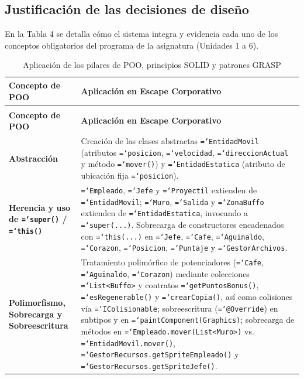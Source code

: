 \documentclass[12pt, a4paper]{article}
\DeclareRobustCommand{\code}[1]{\textcolor{codegreen}{\texttt{\hyphenchar\font=`\-#1}}}
\begin{document}
\subsection{Justificación de las decisiones de diseño}

En la Tabla 4 se detalla cómo el sistema integra y evidencia cada uno de los conceptos obligatorios del programa de la asignatura (Unidades 1 a 6).

{
\begin{longtable}{@{} >{\raggedright\arraybackslash}p{3.8cm} >{\raggedright\arraybackslash}p{11.4cm} @{}}
\caption{Aplicación de los pilares de POO, principios SOLID y patrones GRASP} \\
\toprule
\textbf{Concepto de POO} & \textbf{Aplicación en Escape Corporativo} \\
\midrule
\endfirsthead
\multicolumn{2}{@{}l}{\textit{Tabla 4 (continuación)}} \\[4pt]
\toprule
\textbf{Concepto de POO} & \textbf{Aplicación en Escape Corporativo} \\
\midrule
\endhead
\bottomrule
\endfoot
\bottomrule
\endlastfoot
\textbf{Abstracción} & Creación de las clases abstractas \code{EntidadMovil} (atributos \code{posicion}, \code{velocidad}, \code{direccionActual} y método \code{mover()}) y \code{EntidadEstatica} (atributo de ubicación fija \code{posicion}). \\
\addlinespace[5pt]
\textbf{Herencia y uso de \code{super()} / \code{this()}} & \code{Empleado}, \code{Jefe} y \code{Proyectil} extienden de \code{EntidadMovil}; \code{Muro}, \code{Salida} y \code{ZonaBuffo} extienden de \code{EntidadEstatica}, invocando a \code{super(...)}. Sobrecarga de constructores encadenados con \code{this(...)} en \code{Jefe}, \code{Cafe}, \code{Aguinaldo}, \code{Corazon}, \code{Posicion}, \code{Puntaje} y \code{GestorArchivos}. \\
\addlinespace[5pt]
\textbf{Polimorfismo, Sobrecarga y Sobreescritura} & Tratamiento polimórfico de potenciadores (\code{Cafe}, \code{Aguinaldo}, \code{Corazon}) mediante colecciones \code{List<Buffo>} y contratos \code{getPuntosBonus()}, \code{esRegenerable()} y \code{crearCopia()}, así como colisiones vía \code{IColisionable}; sobreescritura (\code{@Override}) en subtipos y en \code{paintComponent(Graphics)}; sobrecarga de métodos en \code{Empleado.mover(List<Muro>)} vs. \code{EntidadMovil.mover()}, \code{GestorRecursos.getSpriteEmpleado()} y \code{GestorRecursos.getSpriteJefe()}. \\

\end{longtable}}
\end{document}
